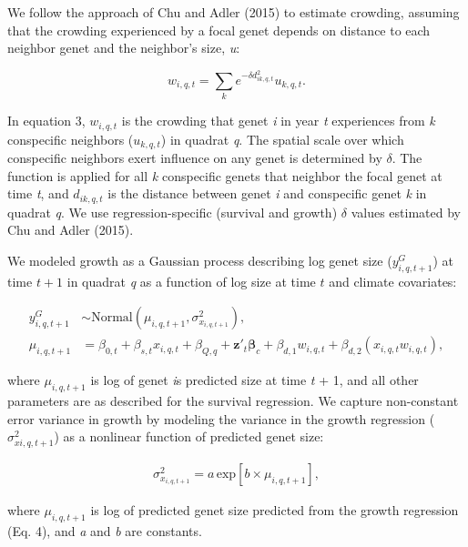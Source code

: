 \documentclass[12pt,]{article}
\begin{document}
We follow the approach of Chu and Adler (2015) to estimate crowding,
assuming that the crowding experienced by a focal genet depends on
distance to each neighbor genet and the neighbor's size, \emph{u}:

\begin{equation}
w_{i,q,t} = \sum_k e^{-\delta d_{ik,q,t}^{2}}u_{k,q,t}.
\end{equation}

In equation 3, \(w_{i,q,t}\) is the crowding that genet \emph{i} in year
\emph{t} experiences from \emph{k} conspecific neighbors (\(u_{k,q,t}\))
in quadrat \emph{q}. The spatial scale over which conspecific neighbors
exert influence on any genet is determined by \(\delta\). The function
is applied for all \emph{k} conspecific genets that neighbor the focal
genet at time \emph{t}, and \(d_{ik,q,t}\) is the distance between genet
\emph{i} and conspecific genet \emph{k} in quadrat \emph{q}. We use
regression-specific (survival and growth) \(\delta\) values estimated by
Chu and Adler (2015).

We modeled growth as a Gaussian process describing log genet size
(\(y_{i,q,t+1}^{G}\)) at time \(t+1\) in quadrat \emph{q} as a function
of log size at time \(t\) and climate covariates:

\vspace{-3em}\begin{align}
y_{i,q,t+1}^G &\sim \text{Normal}(\mu_{i,q,t+1}, \sigma^2_{x_{i,q,t+1}}), \\
\mu_{i,q,t+1} &= \beta_{0,t} + \beta_{s,t}x_{i,q,t} + \beta_{Q,q} + \textbf{z}'_t \boldsymbol{\beta}_c + \beta_{d,1} w_{i,q,t} + \beta_{d,2} (x_{i,q,t}w_{i,q,t}),
\end{align}\vspace{-3em}

where \(\mu_{i,q,t+1}\) is log of genet \emph{i}s predicted size at time
\emph{t} + 1, and all other parameters are as described for the survival
regression. We capture non-constant error variance in growth by modeling
the variance in the growth regression (\(\sigma^2_{x{i,q,t+1}}\)) as a
nonlinear function of predicted genet size:

\vspace{-3em}\begin{align}
\sigma^2_{x_{i,q,t+1}} = a \, \text{exp}[b \times \mu_{i,q,t+1}],
\end{align}\vspace{-3em}

where \(\mu_{i,q,t+1}\) is log of predicted genet size predicted from
the growth regression (Eq. 4), and \emph{a} and \emph{b} are constants.
\end{document}
